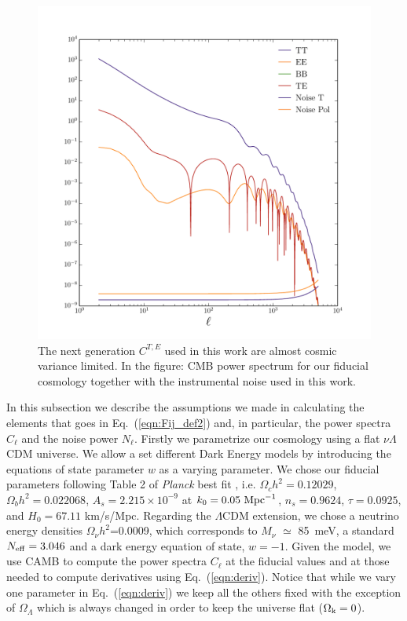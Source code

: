 \documentclass[aps,prd,reprint,superscriptaddress]{revtex4-1}
\newcommand\refeq[1]{Eq.~(\ref{eqn:#1})}
\begin{document}
\begin{figure}[htbp]
\begin{center}
\includegraphics[scale=0.4]{PS_with_noise.pdf}
\caption{The next generation $C^{T,E}$ used in this work are almost cosmic variance limited.
In the figure: CMB power spectrum for our fiducial cosmology together with the instrumental noise used in this work.}
\label{fig:cmb-cl-noise}
\end{center}
\end{figure}

In this subsection we describe the assumptions we made in calculating the elements that goes in \refeq{Fij_def2} and, in particular, the power spectra $C_{\ell}$ and the noise power $N_{\ell}$.
Firstly we parametrize our cosmology using a flat $\nu \Lambda$CDM universe. We allow a set different Dark Energy models by introducing the equations of state parameter $w$ as a varying parameter.
We chose our fiducial parameters following Table 2 of \textit{Planck} best fit \cite{planck-collaboration:2014g}, i.e. $\Omega_c h^2 = 0.12029$, $\Omega_b h^2 = 0.022068$, $A_s = 2.215\times10^{-9}$ at $k_0 = 0.05\ {\rm Mpc}^{-1}$, $n_s = 0.9624$, $\tau = 0.0925$, and $H_0 = 67.11$ km/s/Mpc. Regarding the $\Lambda$CDM extension, we chose a neutrino energy densities $\Omega_{\nu} h^2$=0.0009, which corresponds to $M_{\nu}$ $\simeq$ 85\ meV, a standard $N_{\rm eff}=3.046$ and a dark energy equation of state, $w=-1$.
Given the model, we use CAMB \cite{Lewis:1999bs} to compute the power spectra $C_{\ell}$ at the fiducial values and at those needed to compute derivatives using \refeq{deriv}. Notice that while we vary one parameter in \refeq{deriv} we keep all the others fixed with the exception of $\Omega_{\Lambda}$ which is always changed in order to keep the universe flat ($\Omega_{\rm k} = 0$).
\end{document}
